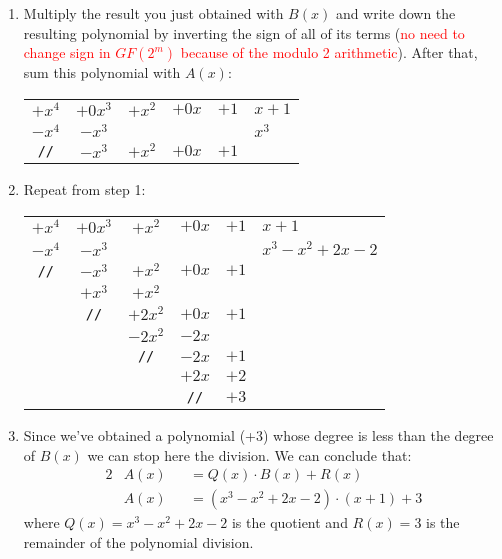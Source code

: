 \begin{enumerate}
\begin{center}
\begin{tabular}{ccccc|l}
        \end{tabular}
    \end{center}
    \item Multiply the result you just obtained with $B(x)$ and write down the resulting polynomial by inverting the sign of all of its terms (\textcolor{red}{no need to change sign in $GF(2^m)$ because of the modulo 2 arithmetic}). After that, sum this polynomial with $A(x)$:
    \begin{center}
        \begin{tabular}{ccccc|l}
             $+x^4$ & $+0 x^3$ & $+x^2$ & $+0 x$ & $+1$ & $x+1$ \\
             \cline{6-6}
             $-x^4$ & $-x^3$   &        &        &      & $x^3$\\
             \cline{1-5}
             \texttt{//}     & $-x^3$   & $+x^2$ & $+0x$  & $+1$ &
        \end{tabular}
    \end{center}
    \item Repeat from step 1:
    \begin{center}
        \begin{tabular}{ccccc|l}
             $+x^4$ & $+0 x^3$ & $+x^2$ & $+0 x$ & $+1$ & $x+1$ \\
             \cline{6-6}
             $-x^4$ & $-x^3$   &        &        &      & $x^3-x^2+2x-2$\\
             \cline{1-5}
             \texttt{//}     & $-x^3$   & $+x^2$ & $+0x$  & $+1$ &\\
                    & $+x^3$ & $+x^2$   &        &      &\\
            \cline{2-5}
            & \texttt{//}    & $+2x^2$   & $+0x$   & $+1$ &\\
            &                & $-2x^2$   & $-2x$   &      &\\
            \cline{3-5}
            &       & \texttt{//} & $-2x$ & $+1$ &\\
            &       &             & $+2x$ & $+2$ &\\
            \cline{4-5}
            &       &             & \texttt{//} & $+3$ &
        \end{tabular}
    \end{center}
    \item Since we've obtained a polynomial (+3) whose degree is less than the degree of $B(x)$ we can stop here the division. We can conclude that:
    \begin{alignat*}{2}
        &A(x) &&= Q(x)\cdot B(x) + R(x)\\
        &A(x) &&= (x^3-x^2+2x-2)\cdot(x+1)+3
    \end{alignat*}
    where $Q(x)=x^3-x^2+2x-2$ is the quotient and $R(x)=3$ is the remainder of the polynomial division.
\end{enumerate}

